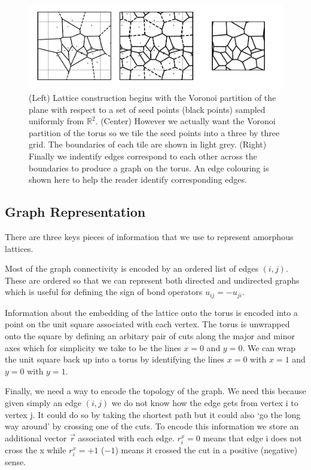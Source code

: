 \begin{figure}
\hypertarget{fig:lattice_construction_animated}{%
\centering
\includegraphics[width=1\textwidth,height=\textheight]{figure_code/amk_chapter/lattice_construction_animated/lattice_construction_animated.pdf}
\caption{(Left) Lattice construction begins with the Voronoi partition
of the plane with respect to a set of seed points (black points) sampled
uniformly from \(\mathbb{R}^2\). (Center) However we actually want the
Voronoi partition of the torus so we tile the seed points into a three
by three grid. The boundaries of each tile are shown in light grey.
(Right) Finally we indentify edges correspond to each other across the
boundaries to produce a graph on the torus. An edge colouring is shown
here to help the reader identify corresponding
edges.}\label{fig:lattice_construction_animated}
}
\end{figure}

\hypertarget{graph-representation}{%
\subsection{Graph Representation}\label{graph-representation}}

There are three keys pieces of information that we use to represent
amorphous lattices.

Most of the graph connectivity is encoded by an ordered list of edges
\((i,j)\). These are ordered so that we can represent both directed and
undirected graphs which is useful for defining the sign of bond
operators \(u_{ij} = - u_{ji}\).

Information about the embedding of the lattice onto the torus is encoded
into a point on the unit square associated with each vertex. The torus
is unwrapped onto the square by defining an arbitary pair of cuts along
the major and minor axes which for simplicity we take to be the lines
\(x = 0\) and \(y = 0\). We can wrap the unit square back up into a
torus by identifying the lines \(x = 0\) with \(x = 1\) and \(y = 0\)
with \(y = 1\).

Finally, we need a way to encode the topology of the graph. We need this
because given simply an edge \((i, j)\) we do not know how the edge gets
from vertex i to vertex j. It could do so by taking the shortest path
but it could also `go the long way around' by crossing one of the cuts.
To encode this information we store an additional vector \(\vec{r}\)
associated with each edge. \(r_i^x = 0\) means that edge i does not
cross the x while \(r_i^x = +1\) (\(-1\)) means it crossed the cut in a
positive (negative) sense.

